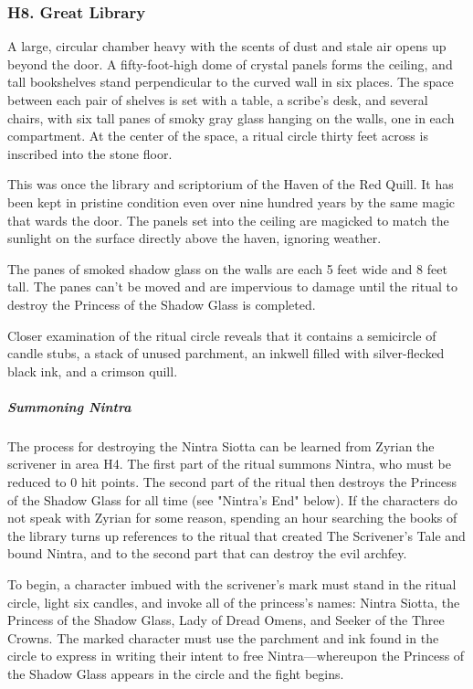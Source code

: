 \documentclass[10pt,a4paper,twoside,bg=print,twocolumn,openany,nodeprecatedcode]{dndbook}
\begin{document}
\subsubsection{H8. Great Library}
\begin{DndReadAloud}{}
A large, circular chamber heavy with the scents of dust and stale air opens up beyond the door. A fifty-foot-high dome of crystal panels forms the ceiling, and tall bookshelves stand perpendicular to the curved wall in six places. The space between each pair of shelves is set with a table, a scribe's desk, and several chairs, with six tall panes of smoky gray glass hanging on the walls, one in each compartment. At the center of the space, a ritual circle thirty feet across is inscribed into the stone floor.

\end{DndReadAloud}

This was once the library and scriptorium of the Haven of the Red Quill. It has been kept in pristine condition even over nine hundred years by the same magic that wards the door. The panels set into the ceiling are magicked to match the sunlight on the surface directly above the haven, ignoring weather.

The panes of smoked shadow glass on the walls are each 5 feet wide and 8 feet tall. The panes can't be moved and are impervious to damage until the ritual to destroy the Princess of the Shadow Glass is completed.

Closer examination of the ritual circle reveals that it contains a semicircle of candle stubs, a stack of unused parchment, an inkwell filled with silver-flecked black ink, and a crimson quill.

\subparagraph{Summoning Nintra}
The process for destroying the Nintra Siotta can be learned from Zyrian the scrivener in area H4. The first part of the ritual summons Nintra, who must be reduced to 0 hit points. The second part of the ritual then destroys the Princess of the Shadow Glass for all time (see "Nintra's End" below). If the characters do not speak with Zyrian for some reason, spending an hour searching the books of the library turns up references to the ritual that created The Scrivener's Tale and bound Nintra, and to the second part that can destroy the evil archfey.

To begin, a character imbued with the scrivener's mark must stand in the ritual circle, light six candles, and invoke all of the princess's names: Nintra Siotta, the Princess of the Shadow Glass, Lady of Dread Omens, and Seeker of the Three Crowns. The marked character must use the parchment and ink found in the circle to express in writing their intent to free Nintra—whereupon the Princess of the Shadow Glass appears in the circle and the fight begins.
\end{document}
